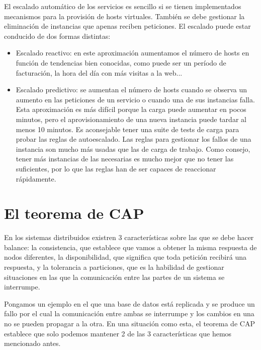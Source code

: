 \documentclass[11pt,a4paper]{article}
\begin{document}
El escalado automático de los servicios es sencillo si se tienen implementados mecanismos para la provisión de hosts virtuales. También se debe gestionar la eliminación de instancias que apenas reciben peticiones. El escalado puede estar conducido de dos formas distintas:

\begin{itemize}

\item Escalado reactivo: en este aproximación aumentamos el número de hosts en función de tendencias bien conocidas, como puede ser un período de facturación, la hora del día con más visitas a la web...

\item Escalado predictivo: se aumentan el número de hosts cuando se observa un aumento en las peticiones de un servicio o cuando una de sus instancias falla. Esta aproximación es más difícil porque la carga puede aumentar en pocos minutos, pero el aprovisionamiento de una nueva instancia puede tardar al menos 10 minutos. Es aconsejable tener una suite de tests de carga para probar las reglas de autoescalado. Las reglas para gestionar los fallos de una instancia son mucho más usadas que las de carga de trabajo. Como consejo, tener más instancias de las necesarias es mucho mejor que no tener las suficientes, por lo que las reglas han de ser capaces de reaccionar rápidamente.

\end{itemize}

\section{El teorema de CAP}

En los sistemas distribuidos existren 3 características sobre las que se debe hacer balance: la consistencia, que establece que vamos a obtener la misma respuesta de nodos diferentes, la disponibilidad, que significa que toda petición recibirá una respuesta, y la tolerancia a particiones, que es la habilidad de gestionar situaciones en las que la comunicación entre las partes de un sistema se interrumpe.

Pongamos un ejemplo en el que una base de datos está replicada y se produce un fallo por el cual la comunicación entre ambas se interrumpe y los cambios en una no se pueden propagar a la otra. En una situación como esta, el teorema de CAP establece que solo podemos mantener 2 de las 3 características que hemos mencionado antes.
\end{document}
